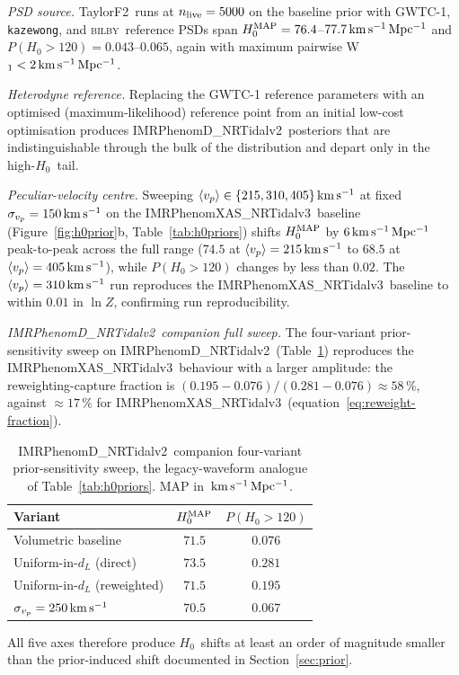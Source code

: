 \documentclass[usenatbib]{mnras}
\newcommand{\kmsmpc}{\ensuremath{\,\rm km\,s^{-1}\,Mpc^{-1}}\xspace}
\newcommand{\kms}{\ensuremath{\,\rm km\,s^{-1}}\xspace}
\newcommand{\hzero}{\ensuremath{H_{0}}\xspace}
\newcommand{\sigmavp}{\ensuremath{\sigma_{v_p}}\xspace}
\newcommand{\IMR}{IMRPhenomD\_NRTidalv2\xspace}
\newcommand{\IMRX}{IMRPhenomXAS\_NRTidalv3\xspace}
\newcommand{\TF}{TaylorF2\xspace}
\newcommand{\bilby}{\textsc{bilby}\xspace}
\begin{document}
\emph{PSD source.} \TF\ runs at $n_{\rm live}=5000$ on the baseline prior with GWTC-1, \texttt{kazewong}, and \bilby\ reference PSDs span $\hzero^{\rm MAP}=76.4$--$77.7\kmsmpc$ and $P(\hzero>120)=0.043$--$0.065$, again with maximum pairwise W$_{1}<2\kmsmpc$.

\emph{Heterodyne reference.} Replacing the GWTC-1 reference parameters with an optimised (maximum-likelihood) reference point from an initial low-cost optimisation produces \IMR\ posteriors that are indistinguishable through the bulk of the distribution and depart only in the high-\hzero\ tail.

\emph{Peculiar-velocity centre.} Sweeping $\langle v_{p}\rangle\in\{215, 310, 405\}\kms$ at fixed $\sigmavp=150\kms$ on the \IMRX\ baseline (Figure~\ref{fig:h0prior}b, Table~\ref{tab:h0priors}) shifts $\hzero^{\rm MAP}$ by $6\kmsmpc$ peak-to-peak across the full range ($74.5$ at $\langle v_{p}\rangle=215\kms$ to $68.5$ at $\langle v_{p}\rangle=405\kms$), while $P(\hzero>120)$ changes by less than $0.02$. The $\langle v_{p}\rangle=310\kms$ run reproduces the \IMRX\ baseline to within $0.01$ in $\ln Z$, confirming run reproducibility.

\emph{\IMR\ companion full sweep.} The four-variant prior-sensitivity sweep on \IMR\ (Table~\ref{tab:imr-sweep}) reproduces the \IMRX\ behaviour with a larger amplitude: the reweighting-capture fraction is $(0.195-0.076)/(0.281-0.076)\approx 58\,\%$, against $\approx 17\,\%$ for \IMRX\ (equation~\ref{eq:reweight-fraction}).

\begin{table}
  \centering
  \caption{\IMR\ companion four-variant prior-sensitivity sweep, the legacy-waveform analogue of Table~\ref{tab:h0priors}. MAP in $\kmsmpc$.}
  \label{tab:imr-sweep}
  \begin{tabular}{lcc}
    \toprule
    Variant & $\hzero^{\rm MAP}$ & $P(\hzero>120)$ \\
    \midrule
    Volumetric baseline           & $71.5$ & $0.076$ \\
    Uniform-in-$d_L$ (direct)     & $73.5$ & $0.281$ \\
    Uniform-in-$d_L$ (reweighted) & $71.5$ & $0.195$ \\
    $\sigmavp=250\kms$            & $70.5$ & $0.067$ \\
    \bottomrule
  \end{tabular}
\end{table}

All five axes therefore produce \hzero\ shifts at least an order of magnitude smaller than the prior-induced shift documented in Section~\ref{sec:prior}.

\label{lastpage}
\end{document}
